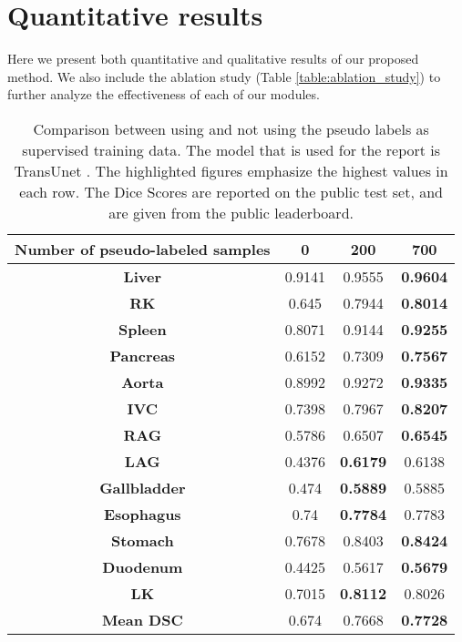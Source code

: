 
\section{Quantitative results}
\label{sec:quantitative}

Here we present both quantitative and qualitative results of our proposed method. We also include the ablation study (Table \ref{table:ablation_study}) to further analyze the effectiveness of each of our modules. 

\begin{table}[h]
\centering
\caption{Comparison between using and not using the pseudo labels as supervised training data. The model that is used for the report is TransUnet \cite{transunet21chen}. The highlighted figures emphasize the highest values in each row. The Dice Scores are reported on the public test set, and are given from the public leaderboard.}
\footnotesize
\begin{tabular}{| c | c | c | c | }
\hline
\textbf{Number of pseudo-labeled samples} & 0 & 200 & 700  \\
\hline
\textbf{Liver} & 0.9141  & 0.9555 & \textbf{0.9604} \\
\textbf{RK} & 0.645 & 0.7944 & \textbf{0.8014} \\
\textbf{Spleen} & 0.8071 & 0.9144 & \textbf{0.9255}	\\
\textbf{Pancreas} & 0.6152 & 0.7309 & \textbf{0.7567}	\\
\textbf{Aorta} & 0.8992 & 0.9272 & \textbf{0.9335} \\
\textbf{IVC} & 0.7398 & 0.7967 & \textbf{0.8207} 	\\
\textbf{RAG} & 0.5786 & 0.6507 & \textbf{0.6545} 	\\
\textbf{LAG} & 0.4376 & \textbf{0.6179} & 0.6138 	\\
\textbf{Gallbladder} & 0.474 & \textbf{0.5889} & 0.5885	\\
\textbf{Esophagus} & 0.74 & \textbf{0.7784} & 0.7783 	\\
\textbf{Stomach} & 0.7678 & 0.8403 & \textbf{0.8424} 	\\
\textbf{Duodenum} & 0.4425 & 0.5617 & \textbf{0.5679}	\\
\textbf{LK} & 0.7015 & \textbf{0.8112} & 0.8026 \\ 
\textbf{Mean DSC} & 0.674 & 0.7668 & \textbf{0.7728} \\ 

\hline
\end{tabular}
\label{table:unlabeled}
\vspace{-2mm}
\end{table}


